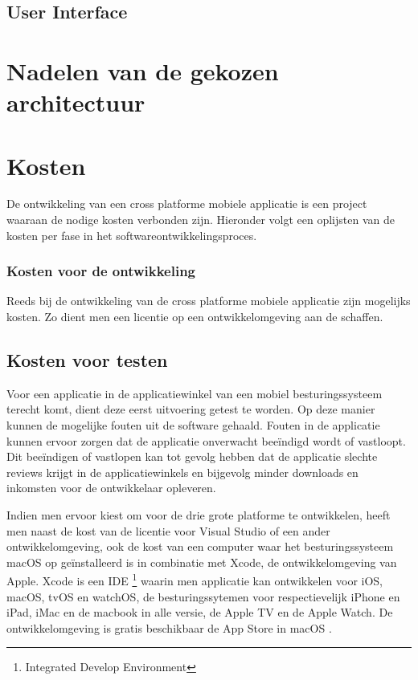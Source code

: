 \subsection{User Interface}
\label{sec:nadelenvandegekozenarchitectuur}
\section{Nadelen van de gekozen architectuur}

\label{sec:Kosten}
\section{Kosten}
De ontwikkeling van een cross platforme mobiele applicatie is een project waaraan de nodige kosten verbonden zijn.
Hieronder volgt een oplijsten van de kosten per fase in het softwareontwikkelingsproces.

\subsubsection{Kosten voor de ontwikkeling}
Reeds bij de ontwikkeling van de cross platforme mobiele applicatie zijn mogelijks kosten. Zo dient men een licentie op een ontwikkelomgeving
aan de schaffen.

\subsection{Kosten voor testen}
Voor een applicatie in de applicatiewinkel van een mobiel besturingssysteem terecht komt, dient deze eerst uitvoering getest te
worden. Op deze manier kunnen de mogelijke fouten uit de software gehaald. Fouten in de applicatie kunnen ervoor zorgen dat de applicatie
onverwacht beeïndigd wordt of vastloopt.
Dit beeïndigen of vastlopen kan tot gevolg hebben dat de applicatie slechte reviews krijgt in de applicatiewinkels en bijgevolg minder downloads en inkomsten voor de ontwikkelaar opleveren.

Indien men ervoor kiest om voor de drie grote platforme te ontwikkelen, heeft men naast de kost van de licentie voor Visual Studio of een ander ontwikkelomgeving,
ook de kost van een computer waar het besturingssysteem macOS op geïnstalleerd is in combinatie met Xcode, de ontwikkelomgeving van Apple.
Xcode is een IDE \footnote{Integrated Develop Environment} waarin men applicatie kan ontwikkelen voor iOS, macOS, tvOS en watchOS, de besturingssytemen voor respectievelijk iPhone en iPad,
iMac en de macbook in alle versie, de Apple TV en de Apple Watch. De ontwikkelomgeving is gratis beschikbaar de App Store in macOS \cite{xcodeindemacappstore2017}.


